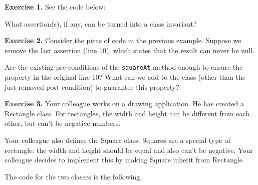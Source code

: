 \textbf{Exercise 1.} See the code below:

\begin{Shaded}
\begin{Highlighting}[]
\NormalTok{(}
\NormalTok{;}
\NormalTok{;}
\NormalTok{;}
\NormalTok{;}
\NormalTok{;}


\NormalTok{;}
\NormalTok{\}}
\end{Highlighting}
\end{Shaded}

What assertion(s), if any, can be turned into a class invariant?

\textbf{Exercise 2.} Consider the piece of code in the previous example.
Suppose we remove the last assertion (line 10), which states that the
result can never be null.

Are the existing pre-conditions of the \texttt{squareAt} method enough
to ensure the property in the original line 10? What can we add to the
class (other than the just removed post-condition) to guarantee this
property?

\textbf{Exercise 3.} Your colleague works on a drawing application. He
has created a Rectangle class. For rectangles, the width and height can
be different from each other, but can't be negative numbers.

Your colleague also defines the Square class. Squares are a special type
of rectangle: the width and height should be equal and also can't be
negative. Your colleague decides to implement this by making Square
inherit from Rectangle.

The code for the two classes is the following.


